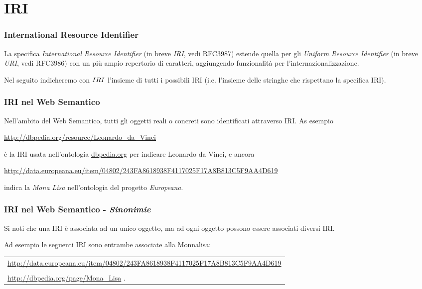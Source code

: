 \documentclass[8pt]{beamer}
\begin{document}
\section{IRI}
\begin{frame}
\frametitle{International Resource Identifier}

La specifica \emph{International Resource Identifier} (in breve \emph{IRI},
vedi RFC3987) estende quella per gli \emph{Uniform Resource Identifier} (in breve \emph{URI},
vedi RFC3986) con un pi\`u ampio repertorio di caratteri, aggiungendo
funzionalit\`a per l'internazionalizzazione.
\vspace{\baselineskip}

Nel seguito indicheremo con $IRI$ l'insieme di tutti
i possibili IRI (i.e. l'insieme delle stringhe che rispettano la 
specifica IRI).
\end{frame}

\begin{frame}
\frametitle{IRI nel Web Semantico}
Nell'ambito del Web Semantico, tutti gli oggetti reali o concreti sono
identificati attraverso IRI. As esempio
\begin{center}
 \url{http://dbpedia.org/resource/Leonardo_da_Vinci}
\end{center}
\`e la IRI usata nell'ontologia \url{dbpedia.org} per indicare
Leonardo da Vinci, e ancora 
\begin{center}
  \begin{small}
    \url{http://data.europeana.eu/item/04802/243FA8618938F4117025F17A8B813C5F9AA4D619}
  \end{small}
\end{center}
indica la \emph{Mona Lisa} nell'ontologia del progetto \emph{Europeana}.
\end{frame}

\begin{frame}
\frametitle{IRI nel Web Semantico - \emph{Sinonimie}}
Si noti che una IRI \`e associata ad un unico oggetto, ma ad 
ogni oggetto possono essere associati diversi IRI.
\vspace{\baselineskip}

Ad esempio le seguenti IRI sono entrambe associate alla Monnalisa:
\vspace{\baselineskip}

\begin{small}
  \begin{tabular}{l}
      \url{http://data.europeana.eu/item/04802/243FA8618938F4117025F17A8B813C5F9AA4D619}\\
    \\
      \url{http://dbpedia.org/page/Mona_Lisa} .
  \end{tabular}
\end{small}
\end{frame}
\end{document}
